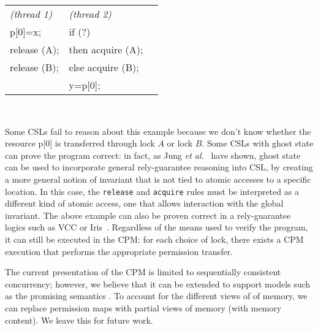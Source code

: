 \begin{tabular}{l@{\qquad\qquad}l@{\qquad\qquad\qquad}l}
\emph{(thread 1)} & \emph{(thread 2)} \\
    p[0]=x;      &  if (?) \\
    release (A); & then acquire (A); \\
    release (B); & else acquire (B); \\
                 & y=p[0]; \\
\end{tabular}

\

\noindent Some CSLs fail to reason about this example because we don't 
know whether the resource p[0] is
transferred through lock $A$ or lock $B$. Some CSLs with ghost state can
prove the program correct: in fact, as Jung \emph{et
  al.}~\cite{jung2015iris} have shown, ghost state can be used to
incorporate general rely-guarantee reasoning into CSL, by creating a
more general notion of invariant that is not tied to atomic accesses
to a specific location. In this case, the \texttt{release} and
\texttt{acquire} rules must be interpreted as a different kind of
atomic access, one that allows interaction with the global
invariant. The above example can also be proven correct in a rely-guarantee logics
such as VCC \cite{cohen09:tphols} or Iris~\cite{jung2015iris}. 
Regardless of the means used to verify the program, it can
still be executed in the CPM: for each choice of lock, there exists a CPM execution that performs the appropriate permission transfer.

The current presentation of the CPM is limited to sequentially consistent concurrency; 
however, we believe that it can be extended to support models such as the promising semantics \cite{Kang2017promising}. To account for the different views of of memory, we can replace permission maps with partial views of memory (with memory content). We leave this for future work.